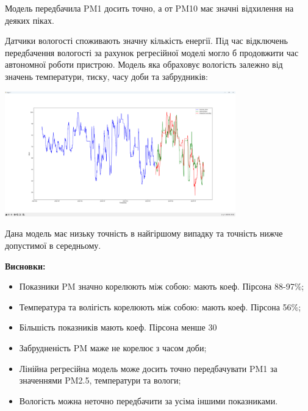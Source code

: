 \documentclass{article}
\begin{document}
Модель передбачила PM1 досить точно, а от PM10 має значні відхилення на деяких піках.\\\indent

Датчики вологості споживають значну кількість енергії. Під час відключень передбачення вологості за рахунок регресійної моделі могло б продовжити час автономної роботи пристрою. Модель яка обраховує вологість залежно від значень температури, тиску, часу доби та забрудників:\\\indent
\begin{center}
    \includegraphics[width=100mm]{humidity}
\end{center}

Дана модель має низьку точність в найгіршому випадку та точність нижче допустимої в середньому.\\\indent


\newpage

\textbf{Висновки:}\\\indent
\begin{itemize}
	\item Показники PM значно корелюють між собою: мають коеф. Пірсона 88-97\%;
	\item Температура та волігість корелюють між собою: мають коеф. Пірсона 56\%;
	\item Більшість показників мають коеф. Пірсона менше 30%
	\item Забрудненість PM маже не корелює з часом доби;
	\item Лінійна регресійна модель може досить точно передбачувати PM1 за значеннями PM2.5, температури та вологи;
	\item Вологість можна неточно передбачити за усіма іншими показниками.
\end{itemize}
\end{document}
